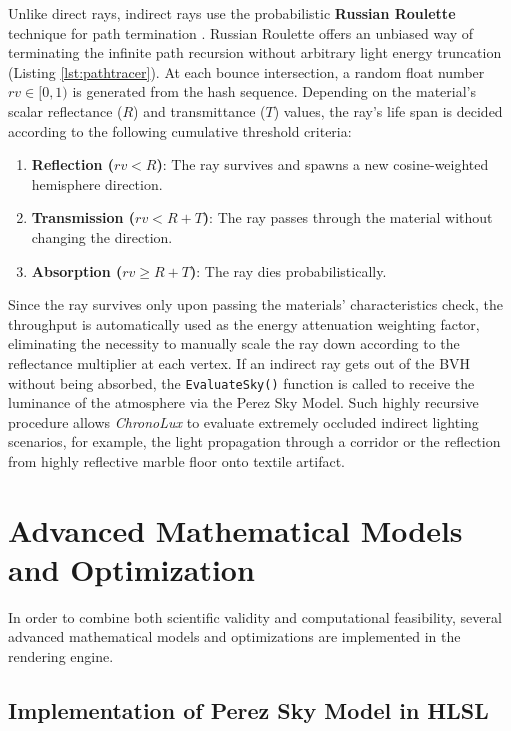 Unlike direct rays, indirect rays use the probabilistic \textbf{Russian Roulette} technique for path termination \cite{pharr2016physically}. Russian Roulette offers an unbiased way of terminating the infinite path recursion without arbitrary light energy truncation (Listing \ref{lst:pathtracer}). At each bounce intersection, a random float number $rv \in [0, 1)$ is generated from the hash sequence. Depending on the material’s scalar reflectance ($R$) and transmittance ($T$) values, the ray’s life span is decided according to the following cumulative threshold criteria:
\begin{enumerate}
    \item \textbf{Reflection ($rv < R$)}: The ray survives and spawns a new cosine-weighted hemisphere direction.
    \item \textbf{Transmission ($rv < R + T$)}: The ray passes through the material without changing the direction.
    \item \textbf{Absorption ($rv \geq R + T$)}: The ray dies probabilistically.
\end{enumerate}

Since the ray survives only upon passing the materials’ characteristics check, the throughput is automatically used as the energy attenuation weighting factor, eliminating the necessity to manually scale the ray down according to the reflectance multiplier at each vertex. If an indirect ray gets out of the BVH without being absorbed, the \texttt{EvaluateSky()} function is called to receive the luminance of the atmosphere via the Perez Sky Model. Such highly recursive procedure allows \textit{ChronoLux} to evaluate extremely occluded indirect lighting scenarios, for example, the light propagation through a corridor or the reflection from highly reflective marble floor onto textile artifact.

\section{Advanced Mathematical Models and Optimization}

In order to combine both scientific validity and computational feasibility, several advanced mathematical models and optimizations are implemented in the rendering engine.

\subsection{Implementation of Perez Sky Model in HLSL}

